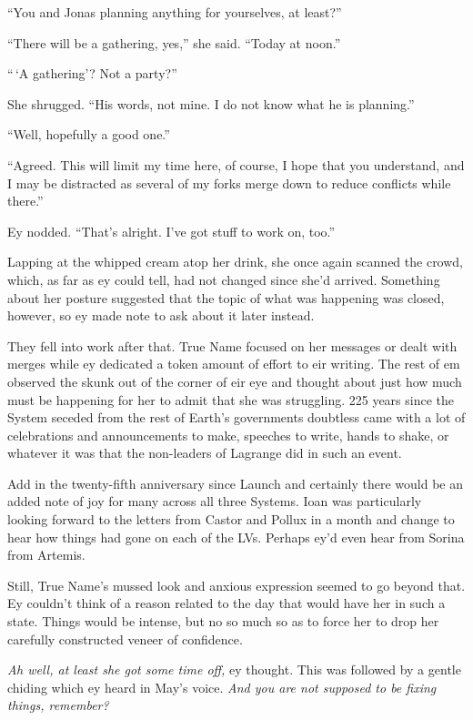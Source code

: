 ``You and Jonas planning anything for yourselves, at least?''

``There will be a gathering, yes,'' she said. ``Today at noon.''

``\,`A gathering'? Not a party?''

She shrugged. ``His words, not mine. I do not know what he is planning.''

``Well, hopefully a good one.''

``Agreed. This will limit my time here, of course, I hope that you understand, and I may be distracted as several of my forks merge down to reduce conflicts while there.''

Ey nodded. ``That's alright. I've got stuff to work on, too.''

Lapping at the whipped cream atop her drink, she once again scanned the crowd, which, as far as ey could tell, had not changed since she'd arrived. Something about her posture suggested that the topic of what was happening was closed, however, so ey made note to ask about it later instead.

They fell into work after that. True Name focused on her messages or dealt with merges while ey dedicated a token amount of effort to eir writing. The rest of em observed the skunk out of the corner of eir eye and thought about just how much must be happening for her to admit that she was struggling. 225 years since the System seceded from the rest of Earth's governments doubtless came with a lot of celebrations and announcements to make, speeches to write, hands to shake, or whatever it was that the non-leaders of Lagrange did in such an event.

Add in the twenty-fifth anniversary since Launch and certainly there would be an added note of joy for many across all three Systems. Ioan was particularly looking forward to the letters from Castor and Pollux in a month and change to hear how things had gone on each of the LVs. Perhaps ey'd even hear from Sorina from Artemis.

Still, True Name's mussed look and anxious expression seemed to go beyond that. Ey couldn't think of a reason related to the day that would have her in such a state. Things would be intense, but no so much so as to force her to drop her carefully constructed veneer of confidence.

\emph{Ah well, at least she got some time off,} ey thought. This was followed by a gentle chiding which ey heard in May's voice. \emph{And you are not supposed to be fixing things, remember?}

